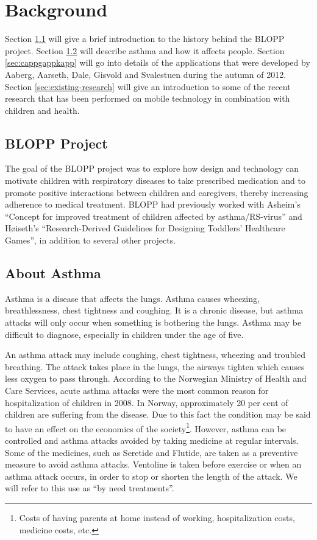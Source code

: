 \chapter{Background}
\label{chp:background}

Section \ref{sec:bloppproject} will give a brief introduction to the history behind the BLOPP project. Section \ref{sec:about-asthma} will describe asthma and how it affects people. Section \ref{sec:cappgappkapp} will go into details of the applications that were developed by Aaberg, Aarseth, Dale, Gisvold and Svalestuen during the autumn of 2012.     
Section \ref{sec:existing-research} will give an introduction to some of the recent research that has been performed on mobile technology in combination with children and health.   


\section{BLOPP Project}
\label{sec:bloppproject}
The goal of the BLOPP project was to explore how design and technology can motivate children with respiratory diseases to take prescribed medication and to promote positive interactions between children and caregivers, thereby increasing adherence to medical treatment. BLOPP had previously worked with Asheim's ``Concept for improved treatment of children affected by asthma/RS-virus''\cite{asheim2012konsept} and H\o iseth's ``Research-Derived Guidelines for Designing Toddlers' Healthcare Games''\cite{hoiseth2013research}, in addition to several other projects.


\section{About Asthma}
\label{sec:about-asthma}
Asthma is a disease that affects the lungs. Asthma causes wheezing, breathlessness, chest tightness and coughing. It is a chronic disease, but asthma attacks will only occur when something is bothering the lungs. Asthma may be difficult to diagnose, especially in children under the age of five. 


An asthma attack may include coughing, chest tightness, wheezing and troubled breathing. The attack takes place in the lungs, the airways tighten which causes less oxygen to pass through.
According to the Norwegian Ministry of Health and Care Services, acute asthma attacks were the most common reason for hospitalization of children in 2008\cite{NationalStrategy}. In Norway, approximately 20 per cent of children are suffering from the disease. Due to this fact the condition may be said to have an effect on the economics of the society\footnote{Costs of having parents at home instead of working, hospitalization costs, medicine costs, etc.}. However, asthma can be controlled and asthma attacks avoided by taking medicine at regular intervals. Some of the medicines, such as Seretide and Flutide, are taken as a preventive measure to avoid asthma attacks. Ventoline is taken before exercise or when an asthma attack occurs, in order to stop or shorten the length of the attack. We will refer to this use as ``by need treatments''. 

